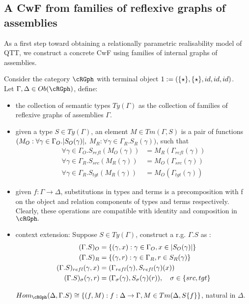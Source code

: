 \documentclass[12pt,a4paper]{article}
\def\src{_{src}}\alwaysmath{src}
\def\rfl{_{refl}}\alwaysmath{rfl}
\def\tgt{_{tgt}}\alwaysmath{tgt}
\renewcommand{\O}{_{O}}
\newcommand{\R}{\ensuremath{_{R}}}
\begin{document}
\subsection*{A CwF from families of reflexive graphs of assemblies}
As a first step toward obtaining a relationally parametric realisability model of QTT, we construct a concrete CwF using families of internal graphs of assemblies.

Consider the category $\cRGph$ with terminal object $1 := (\{\star\}, \{\star\}, id, id, id)$.\\
Let $\Gamma, \Delta \in \ob\cRGph$, define: 
\begin{itemize}[noitemsep]
  \item the collection of semantic types $Ty(\Gamma)$ as the collection of families of reflexive graphs of assemblies $\Gamma$.
  
  \item given a type $S \in Ty(\Gamma)$, an element $M \in Tm(\Gamma, S)$ is a pair of functions $({M\O : \forall \gamma \in \Gamma\O. \carr{S\O(\gamma)}},$ ${M\R : \forall \gamma \in \Gamma\R. S\R(\gamma)})$, such that 
  \begin{align*}
    \forall \gamma \in \Gamma\O. {S\rfl} (M\O(\gamma)) &= M\R(\Gamma\rfl(\gamma))\\
    \forall \gamma \in \Gamma\R. {S\src} (M\R(\gamma)) &= M\O(\Gamma\src(\gamma))\\
    \forall \gamma \in \Gamma\R. {S\tgt} (M\R(\gamma)) &= M\O(\Gamma\tgt(\gamma))
  \end{align*}
  
  \item given $f : \Gamma \to \Delta$, substitutions in types and terms is a precomposition with f on the object and relation components of types and terms respectively. Clearly, these operations are compatible with identity and composition in $\cRGph.$
  
  \item context extension: Suppose $S \in Ty(\Gamma)$, construct a r.g. $\Gamma.S$ as :
  \begin{align*}
    (\Gamma.S)\O &= \{(\gamma, x) : \gamma \in \Gamma\O, x \in \carr{S\O(\gamma)}\}\\
    (\Gamma.S)\R &= \{(\gamma, r) : \gamma \in \Gamma\R, r \in S\R(\gamma)\}\\
    (\Gamma.S)\rfl(\gamma, x) &= (\Gamma\rfl(\gamma), S\rfl(\gamma)(x))\\
    (\Gamma.S)_\sigma(\gamma, r) &= (\Gamma_\sigma(\gamma), S_\sigma(\gamma)(r)),\quad \sigma \in \{src, tgt\}
  \end{align*}
  \begin{claim}
    $Hom_{\cRGph}(\Delta, \Gamma.S) \cong \{(f,M): f : \Delta \to \Gamma, M \in Tm(\Delta, S\{f\}\}$, natural in $\Delta$.
  \end{claim}
  

\end{itemize}
\end{document}
